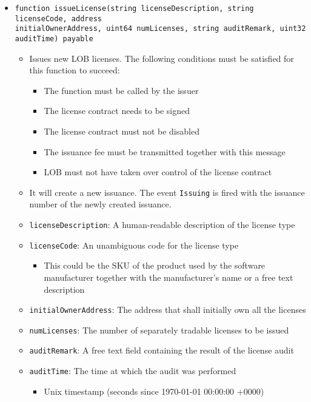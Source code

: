 \documentclass[a4paper]{article}
\begin{document}
\begin{itemize}
  \item \texttt{function issueLicense(string licenseDescription, string licenseCode, address \\ initialOwnerAddress, uint64 numLicenses, string auditRemark, uint32 auditTime) payable}
  \begin{itemize}
    \item Issues new LOB licenses. The following conditions must be satisfied for this function to succeed:
    \begin{itemize}
      \item The function must be called by the issuer
      \item The license contract needs to be signed
      \item The license contract must not be disabled
      \item The issuance fee must be transmitted together with this message
      \item LOB must not have taken over control of the license contract
    \end{itemize}
    \item It will create a new issuance. The event \texttt{Issuing} is fired with the issuance number of the newly created issuance.
    \item \texttt{licenseDescription}: A human-readable description of the license type
    \item \texttt{licenseCode}: An unambiguous code for the license type
    \begin{itemize}
      \item This could be the SKU of the product used by the software manufacturer together with the manufacturer's name or a free text description
    \end{itemize}
    \item \texttt{initialOwnerAddress}: The address that shall initially own all the licenses
    \item \texttt{numLicenses}: The number of separately tradable licenses to be issued
    \item \texttt{auditRemark}: A free text field containing the result of the license audit
    \item \texttt{auditTime}: The time at which the audit was performed
    \begin{itemize}
      \item Unix timestamp (seconds since 1970-01-01 00:00:00 +0000)
    \end{itemize}
  \end{itemize}
  

\end{itemize}
\end{document}
